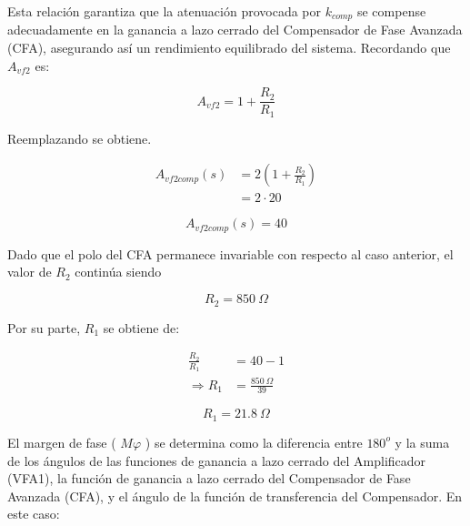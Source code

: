 \hspace{1mm} Esta relación garantiza que la atenuación provocada por $k_{comp}$ se compense adecuadamente en la ganancia a lazo cerrado del Compensador de Fase Avanzada (CFA), asegurando así un rendimiento equilibrado del sistema. Recordando que $A_{vf2}$ es:

\begin{equation}
    A_{vf2} = 1 + \frac{R_2}{R_1}
\end{equation}

\hspace{1mm} Reemplazando se obtiene.

\begin{equation}
    \begin{aligned}
        A_{vf2 comp} (s) &= 2 \left( 1 + \frac{R_2}{R_1} \right)\\
             &= 2 \cdot 20
    \end{aligned}
\end{equation}

\begin{equation}
    \boxed{
    A_{vf2 comp} (s) = 40
    }
\end{equation}

\hspace{1mm} Dado que el polo del CFA permanece invariable con respecto al caso anterior, el valor de $R_2$ continúa siendo 

\begin{equation}
    \boxed{
    R_2 = 850~\Omega
    }
\end{equation}

\hspace{1mm} Por su parte, $R_1$ se obtiene de:

\begin{equation}
    \begin{aligned}
        \frac{R_2}{R_1} &= 40 - 1 \\
    \Longrightarrow R_1 &= \frac{850~\Omega}{39}
    \end{aligned}
\end{equation}

\begin{equation}
    \boxed{
    R_1 = 21.8~\Omega
    }
\end{equation}

\hspace{1mm} El margen de fase ( $M\varphi$ ) se determina como la diferencia entre $180^o$ y la suma de los ángulos de las funciones de ganancia a lazo cerrado del Amplificador (VFA1), la función de ganancia a lazo cerrado del Compensador de Fase Avanzada (CFA), y el ángulo de la función de transferencia del Compensador. En este caso:

